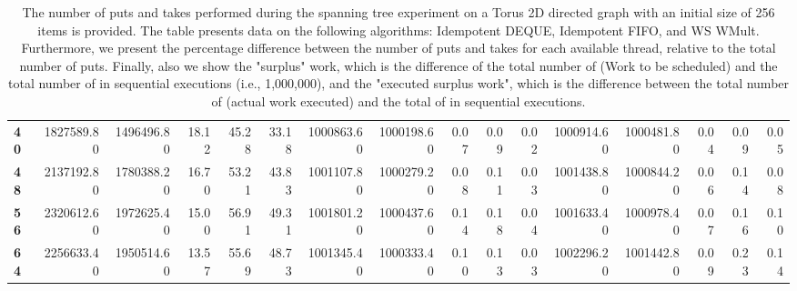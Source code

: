 \begin{table}[!ht]
{\begin{tabular}{lrrrrrrrrrrrrrrr}
\textbf{40} &       1827589.80 & 1496496.80 &          18.12 &       45.28 &                33.18 &      1000863.60 & 1000198.60 &           0.07 &        0.09 &                 0.02 & 1000914.60 & 1000481.80 &           0.04 &        0.09 &                 0.05 \\
\textbf{48} &       2137192.80 & 1780388.20 &          16.70 &       53.21 &                43.83 &      1001107.80 & 1000279.20 &           0.08 &        0.11 &                 0.03 & 1001438.80 & 1000844.20 &           0.06 &        0.14 &                 0.08 \\
\textbf{56} &       2320612.60 & 1972625.40 &          15.00 &       56.91 &                49.31 &      1001801.20 & 1000437.60 &           0.14 &        0.18 &                 0.04 & 1001633.40 & 1000978.40 &           0.07 &        0.16 &                 0.10 \\
\textbf{64} &       2256633.40 & 1950514.60 &          13.57 &       55.69 &                48.73 &      1001345.40 & 1000333.40 &           0.10 &        0.13 &                 0.03 & 1002296.20 & 1001442.80 &           0.09 &        0.23 &                 0.14 \\
\bottomrule
\end{tabular}}
\label{difference-Torus_2D_directed-256-IDEMPOTENT_DEQUE-IDEMPOTENT_FIFO-WS_NC_MULT_OPT}
\caption{The number of puts and takes performed during the
    spanning tree experiment on a Torus 2D directed graph with an initial size
    of 256 items is provided. The table presents data on the
    following algorithms: Idempotent DEQUE, Idempotent FIFO, and
    WS WMult. Furthermore, we present the percentage difference
    between the number of puts and takes for each available thread,
    relative to the total number of puts. Finally, also we show the
    "surplus" work, which is the difference of the total number of
    \Puts (Work to be scheduled) and the total number of \Puts in
    sequential executions (i.e., 1,000,000), and the "executed surplus
    work", which is the difference between the total number of \Takes
    (actual work executed) and the total of \Takes in sequential
    executions.}
\end{table}
